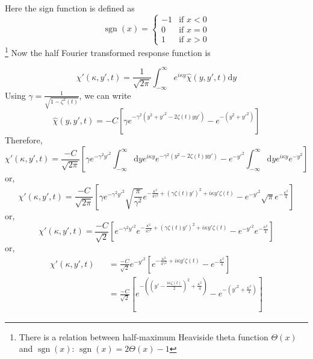 \documentclass{article}
\DeclareMathOperator{\sign}{sgn}
\newcommand{\eq}{\begin{equation}}
\newcommand{\qe}{\end{equation}}
\newcommand{\lp}{\left(}
\newcommand{\rp}{\right)}
\newcommand{\diff}{\mathrm{d}}
\newcommand{\threepartdef}[6]
{
	\left\{
		\begin{array}{lll}
			#1 & \mbox{if } #2 \\
			#3 & \mbox{if } #4 \\
			#5 & \mbox{if } #6
		\end{array}
	\right.
}
\begin{document}
Here the sign function is defined as 
\eq
\sign(x) = \threepartdef { -1} {x < 0} {0} {x = 0} {1} {x>0} 
\qe
\footnote{There is a relation between half-maximum Heaviside theta function $\Theta(x)$ and $\sign(x)$: $\sign(x) = 2\Theta(x)-1$}
Now the half Fourier transformed response function is 

\eq
 \chi'(\kappa, y', t) = \frac{1}{\sqrt{2\pi}}\int_{-\infty}^{\infty} e^{i\kappa y} \hat{\chi}(y, y', t)\diff y
\qe
Using $\gamma = \frac{1}{\sqrt{1-\zeta^2(t)}}$, we can write
\eq
 \hat{\chi}(y, y', t) = -C\left[ \gamma e^{-\gamma^2 \lp y^{2}+{y'}^{2}-2\zeta(t)yy'\rp} -e^{-(y^2+{y'}^{2})}\right]
\qe
Therefore, 
\eq
 \chi'(\kappa, y', t) = \frac{-C}{\sqrt{2\pi}}\left[ \gamma e^{-\gamma^2 {y'}^{2}}\int_{-\infty}^{\infty} \diff y e^{i\kappa y} e^{-\gamma^2 \lp y^2 -2\zeta(t) y y'\rp} -e^{-{y'}^2}\int_{-\infty}^{\infty} \diff y e^{i\kappa y} e^{-y^2} \right]
\qe
or,
\eq
 \chi'(\kappa, y', t) = \frac{-C}{\sqrt{2\pi}}\left[ \gamma e^{-\gamma^2 {y'}^{2}} \sqrt{\frac{\pi}{\gamma^2} }e^{-\frac{\kappa^2}{4\gamma^2} + (\gamma \zeta(t)y')^2+ i\kappa y' \zeta(t)} -e^{-{y'}^2} \sqrt{\pi} e^{-\frac{\kappa^2}{4} } \right]
\qe
or,
\eq
 \chi'(\kappa, y', t) = \frac{-C}{\sqrt{2}}\left[  e^{-\gamma^2 {y'}^{2}} e^{-\frac{\kappa^2}{4\gamma^2} + (\gamma \zeta(t)y')^2+ i\kappa y' \zeta(t)} -e^{-{y'}^2}  e^{-\frac{\kappa^2}{4} } \right]
\qe
or, 
\begin{eqnarray}
\chi'(\kappa, y', t) &&= \frac{-C}{\sqrt{2}}e^{-{y'}^{2}} \left[  e^{-\frac{\kappa^2}{4\gamma^2} + i\kappa y' \zeta(t)} -  e^{-\frac{\kappa^2}{4} } \right]\\
&& = \frac{-C}{\sqrt{2}} \left[  e^{-\lp \lp y'-\frac{i\kappa \zeta(t)}{2} \rp^{2}+ \frac{\kappa^2}{4}\rp} -  e^{- \lp {y'}^{2}+\frac{\kappa^2}{4}\rp } \right]
\end{eqnarray}
\end{document}
